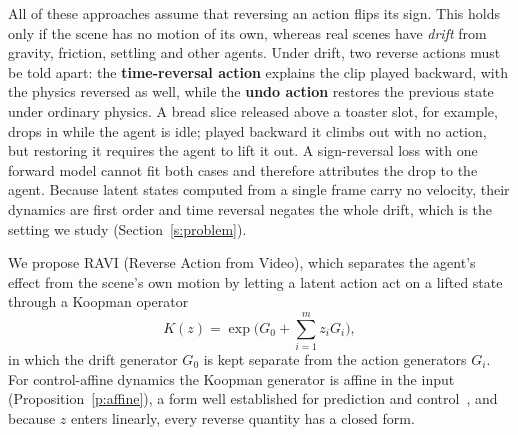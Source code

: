 \documentclass{jcse}
\newcommand{\method}{RAVI}
\begin{document}
All of these approaches assume that reversing an action flips its sign.
This holds only if the scene has no motion of its own, whereas real scenes have \emph{drift} from gravity, friction, settling and other agents.
Under drift, two reverse actions must be told apart: the \textbf{time-reversal action} explains the clip played backward, with the physics reversed as well, while the \textbf{undo action} restores the previous state under ordinary physics.
A bread slice released above a toaster slot, for example, drops in while the agent is idle; played backward it climbs out with no action, but restoring it requires the agent to lift it out.
A sign-reversal loss with one forward model cannot fit both cases and therefore attributes the drop to the agent.
Because latent states computed from a single frame carry no velocity, their dynamics are first order and time reversal negates the whole drift, which is the setting we study (Section~\ref{s:problem}).

We propose {\method} (Reverse Action from Video), which separates the agent's effect from the scene's own motion by letting a latent action act on a lifted state through a Koopman operator~\cite{koopman1931,mezic2005spectral,brunton2022modern}
\begin{equation}
K(z)=\exp\Big(G_0+\sum_{i=1}^m z_iG_i\Big),
\label{e:koopman}
\end{equation}
in which the drift generator $G_0$ is kept separate from the action generators $G_i$.
For control-affine dynamics the Koopman generator is affine in the input~\cite{goswami2017global,bruder2021bilinear} (Proposition~\ref{p:affine}), a form well established for prediction and control~\cite{korda2018koopman}, and because $z$ enters linearly, every reverse quantity has a closed form.
\end{document}
